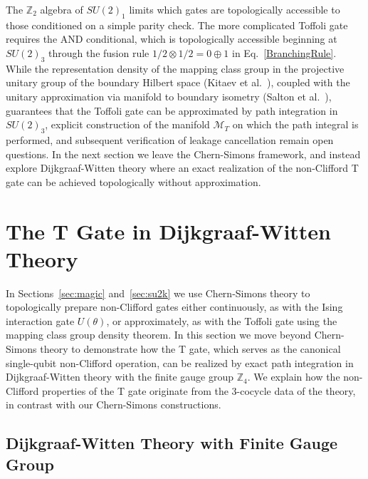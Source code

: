 \documentclass[12pt,a4paper]{article}
\begin{document}
The $\mathbb{Z}_2$ algebra of $SU(2)_1$ limits which gates are topologically accessible to those conditioned on a simple parity check. The more complicated Toffoli gate requires the AND conditional, which is topologically accessible beginning at $SU(2)_3$ through the fusion rule $1/2 \otimes 1/2 = 0 \oplus 1$ in Eq.\ \eqref{BranchingRule}. While the representation density of the mapping class group in the projective unitary group of the boundary Hilbert space (Kitaev et al.~\cite{Freedman2003}), coupled with the unitary approximation via manifold to boundary isometry (Salton et al.~\cite{Salton:2016qpp}), guarantees that the Toffoli gate can be approximated by path integration in $SU(2)_3$, explicit construction of the manifold $\mathcal{M}_T$ on which the path integral is performed, and subsequent verification of leakage cancellation remain open questions. In the next section we leave the Chern-Simons framework, and instead explore Dijkgraaf-Witten theory where an exact realization of the non-Clifford T gate can be achieved topologically without approximation.


 
\section{The T Gate in Dijkgraaf-Witten Theory}\label{sec:DW}
 

In Sections~\ref{sec:magic} and~\ref{sec:su2k} we use Chern-Simons theory to topologically prepare non-Clifford gates either continuously, as with the Ising interaction gate $U(\theta)$, or approximately, as with the Toffoli gate using the mapping class group density theorem. In this section we move beyond Chern-Simons theory to demonstrate how the T gate, which serves as the canonical single-qubit non-Clifford operation, can be realized by exact path integration in Dijkgraaf-Witten theory with the finite gauge group $\mathbb{Z}_4$. We explain how the non-Clifford properties of the T gate originate from the 3-cocycle data of the theory, in contrast with our Chern-Simons constructions.

\subsection{Dijkgraaf-Witten Theory with Finite Gauge Group}\label{subsec:DW_intro}
\end{document}
